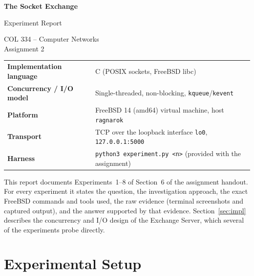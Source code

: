 \documentclass[11pt,a4paper]{article}
\begin{document}
\begin{titlepage}
\centering
\vspace*{2.5cm}

{\Huge\bfseries The Socket Exchange\par}
\vspace{0.6cm}
{\LARGE Experiment Report\par}
\vspace{0.4cm}
{\large COL 334 -- Computer Networks \\ Assignment 2\par}

\vspace{2.2cm}

\begin{tabular}{@{}ll@{}}
\toprule
\textbf{Implementation language} & C (POSIX sockets, FreeBSD libc) \\
\textbf{Concurrency / I/O model} & Single-threaded, non-blocking, \texttt{kqueue}/\texttt{kevent} \\
\textbf{Platform}                & FreeBSD 14 (amd64) virtual machine, host \texttt{ragnarok} \\
\textbf{Transport}               & TCP over the loopback interface \texttt{lo0}, \texttt{127.0.0.1:5000} \\
\textbf{Harness}                 & \texttt{python3 experiment.py <n>} (provided with the assignment) \\
\bottomrule
\end{tabular}

\vspace{2.2cm}

\begin{minipage}{0.85\linewidth}
\small
This report documents Experiments~1--8 of Section~6 of the assignment handout.
For every experiment it states the question, the investigation approach, the exact
FreeBSD commands and tools used, the raw evidence (terminal screenshots and captured
output), and the answer supported by that evidence.  Section~\ref{sec:impl} describes
the concurrency and I/O design of the Exchange Server, which several of the
experiments probe directly.
\end{minipage}

\vfill
\end{titlepage}

\tableofcontents
\newpage

\section{Experimental Setup}
\end{document}
